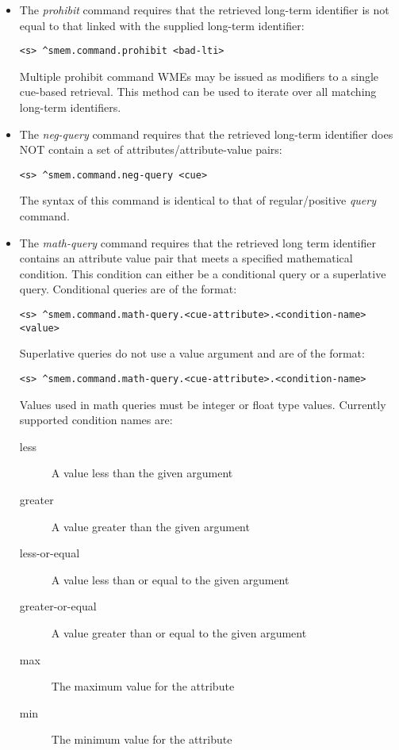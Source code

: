 \begin{itemize}

\item 
The \emph{prohibit} command requires that the retrieved long-term identifier is not equal to that linked with the supplied long-term identifier:
\begin{verbatim}
<s> ^smem.command.prohibit <bad-lti>
\end{verbatim}
Multiple prohibit command WMEs may be issued as modifiers to a single cue-based retrieval.  
This method can be used to iterate over all matching long-term identifiers.

\item 
The \emph{neg-query} command requires that the retrieved long-term identifier does NOT contain a set of attributes/attribute-value pairs:
\begin{verbatim}
<s> ^smem.command.neg-query <cue>
\end{verbatim}
The syntax of this command is identical to that of regular/positive \emph{query} command.

\item
The \emph{math-query} command requires that the retrieved long term identifier contains an attribute value pair that meets a specified mathematical condition. 
This condition can either be a conditional query or a superlative query. 
Conditional queries are of the format:
\begin{verbatim}
<s> ^smem.command.math-query.<cue-attribute>.<condition-name> <value>
\end{verbatim}
Superlative queries do not use a value argument and are of the format:
\begin{verbatim}
<s> ^smem.command.math-query.<cue-attribute>.<condition-name>
\end{verbatim}
Values used in math queries must be integer or float type values.
Currently supported condition names are:
\begin{description}
  \item[less] A value less than the given argument
  \item[greater] A value greater than the given argument
  \item[less-or-equal] A value less than or equal to the given argument
  \item[greater-or-equal] A value greater than or equal to the given argument
  \item[max] The maximum value for the attribute
  \item[min] The minimum value for the attribute
\end{description}
\end{itemize}

